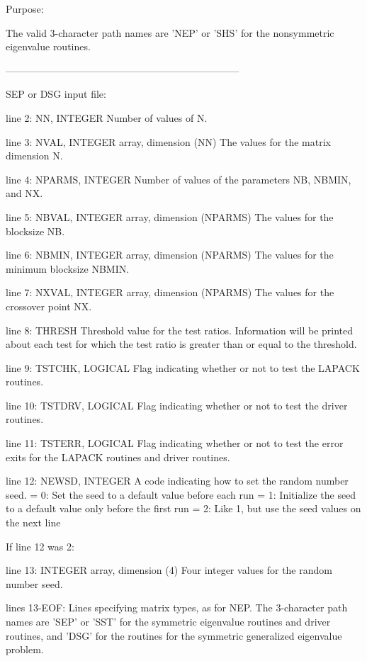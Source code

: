 \begin{DoxyParagraph}{Purpose\+: }
\begin{DoxyVerb}
          The valid 3-character path names are 'NEP' or 'SHS' for the
          nonsymmetric eigenvalue routines.

-----------------------------------------------------------------------

 SEP or DSG input file:

 line 2:  NN, INTEGER
          Number of values of N.

 line 3:  NVAL, INTEGER array, dimension (NN)
          The values for the matrix dimension N.

 line 4:  NPARMS, INTEGER
          Number of values of the parameters NB, NBMIN, and NX.

 line 5:  NBVAL, INTEGER array, dimension (NPARMS)
          The values for the blocksize NB.

 line 6:  NBMIN, INTEGER array, dimension (NPARMS)
          The values for the minimum blocksize NBMIN.

 line 7:  NXVAL, INTEGER array, dimension (NPARMS)
          The values for the crossover point NX.

 line 8:  THRESH
          Threshold value for the test ratios.  Information will be
          printed about each test for which the test ratio is greater
          than or equal to the threshold.

 line 9:  TSTCHK, LOGICAL
          Flag indicating whether or not to test the LAPACK routines.

 line 10: TSTDRV, LOGICAL
          Flag indicating whether or not to test the driver routines.

 line 11: TSTERR, LOGICAL
          Flag indicating whether or not to test the error exits for
          the LAPACK routines and driver routines.

 line 12: NEWSD, INTEGER
          A code indicating how to set the random number seed.
          = 0:  Set the seed to a default value before each run
          = 1:  Initialize the seed to a default value only before the
                first run
          = 2:  Like 1, but use the seed values on the next line

 If line 12 was 2:

 line 13: INTEGER array, dimension (4)
          Four integer values for the random number seed.

 lines 13-EOF:  Lines specifying matrix types, as for NEP.
          The 3-character path names are 'SEP' or 'SST' for the
          symmetric eigenvalue routines and driver routines, and
          'DSG' for the routines for the symmetric generalized
          eigenvalue problem.


\end{DoxyVerb}
\end{DoxyParagraph}
